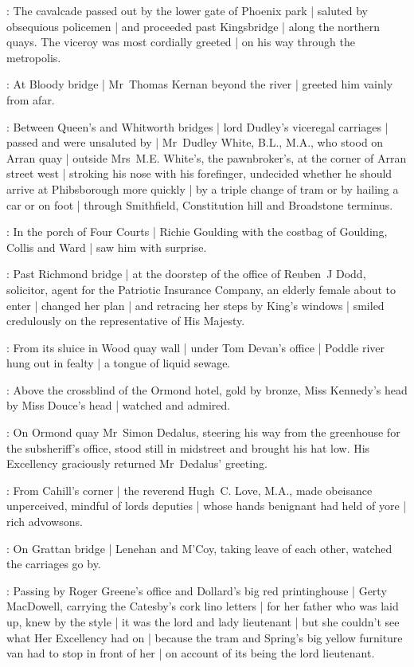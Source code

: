 :
The cavalcade passed out by the lower gate of Phoenix park |
saluted by obsequious policemen |
and proceeded past Kingsbridge |
along the northern quays.
The viceroy was most cordially greeted |
on his way through the metropolis.

:
At Bloody bridge |
Mr~Thomas Kernan beyond the river |
greeted him vainly from afar.

:
Between Queen's and Whitworth bridges |
lord Dudley's viceregal carriages |
passed and were unsaluted by |
Mr~Dudley White, B.L., M.A.,
who stood on Arran quay |
outside Mrs~M.E. White's,
the pawnbroker's,
at the corner of Arran street west |
stroking his nose with his forefinger,
undecided whether he should arrive at Phibsborough more quickly |
by a triple change of tram
or by hailing a car
or on foot |
through Smithfield, Constitution hill and Broadstone terminus.%

:
In the porch of Four Courts |
Richie Goulding
with the costbag of Goulding, Collis and Ward |
saw him with surprise.

:
Past Richmond bridge |
at the doorstep
of the office of Reuben~J Dodd, solicitor,
agent for the Patriotic Insurance Company,
an elderly female about to enter |
changed her plan |
and retracing her steps by King's windows |
smiled credulously
on the representative of His Majesty.

:
From its sluice in Wood quay wall |
under Tom Devan's office |
Poddle river hung out in fealty |
a tongue of liquid sewage.

:
Above the crossblind of the Ormond hotel,
gold by bronze,
Miss Kennedy's head by Miss Douce's head |
watched and admired.

:
On Ormond quay
Mr~Simon Dedalus,
steering his way from the greenhouse for the subsheriff's office,%
stood still in midstreet
and brought his hat low.
His Excellency graciously returned Mr~Dedalus' greeting.

:
From Cahill's corner |
the reverend Hugh~C. Love, M.A.,
made obeisance
unperceived,
mindful of lords deputies |
whose hands benignant
had held of yore |
rich advowsons.

:
On Grattan bridge |
Lenehan and M'Coy,
taking leave of each other,
watched the carriages go by.

:
Passing by Roger Greene's office
and Dollard's big red printinghouse |
Gerty MacDowell,
carrying the Catesby's cork lino letters |
for her father who was laid up,
knew by the style |
it was the lord and lady lieutenant |
but she couldn't see
what Her Excellency had on |
because the tram 
and Spring's big yellow furniture van
had to stop in front of her |
on account of its being the lord lieutenant.

